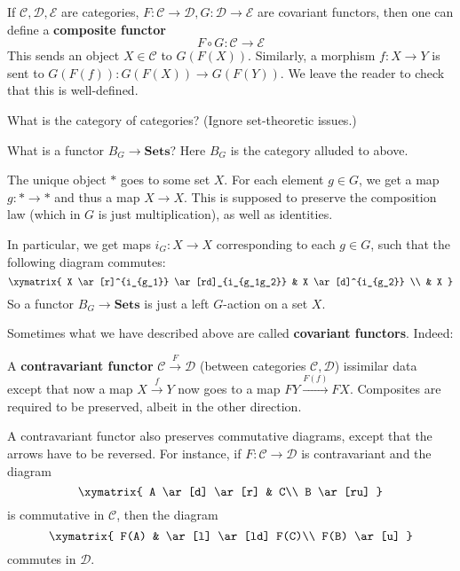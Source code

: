 \begin{definition}
If $\mathcal{C}, \mathcal{D}, \mathcal{E}$ are categories, $F: \mathcal{C} \to
\mathcal{D}, G: \mathcal{D} \to \mathcal{E}$ are covariant functors, then one
can define a \textbf{composite functor}
\[ F \circ G: \mathcal{C}  \to \mathcal{E}  \]
This sends an object $X \in \mathcal{C}$ to $G(F(X))$.
Similarly, a morphism $f :X \to Y$ is sent to $G(F(f)): G(F(X)) \to G(F(Y))$.
We leave the reader to check that this is well-defined.
\end{definition}

\begin{exercise}
What is the category of categories? (Ignore set-theoretic issues.)
\end{exercise}


\begin{example}
What is a functor $B_G \stackrel{}{\to} \mathbf{Sets}$? Here $B_G$ is the
category alluded to above.

The unique object $\ast$ goes to some set $X$. For each element $g \in G$, we
get a map $g: \ast \to \ast$ and thus a map $X \to X$. This is supposed to
preserve the composition law (which in $G$ is just multiplication), as well as
identities.

In particular, we get maps $i_G: X \to X$ corresponding to each $g \in G$, such
that the following diagram commutes:
\[ \xymatrix{
X \ar[r]^{i_{g_1}} \ar[rd]_{i_{g_1g_2}} & X \ar[d]^{i_{g_2}} \\ & X
}\]
So a functor $B_G \to \mathbf{Sets}$ is just a left $G$-action on a set $X$.
\end{example}

Sometimes what we have described above are called \textbf{covariant functors}.
Indeed:

\begin{definition}
A \textbf{contravariant functor}  $\mathcal{C}
\stackrel{F}{\to}\mathcal{D}$ (between categories $\mathcal{C}, \mathcal{D}$)
issimilar
data except that now a map $X \stackrel{f}{\to} Y$ now goes to a map $FY
\stackrel{F(f)}{\to} FX$. Composites
are required to be preserved, albeit in the other direction.
\end{definition}

A contravariant functor also preserves commutative diagrams, except that the
arrows have to be reversed. For instance, if $F: \mathcal{C} \to \mathcal{D}$
is contravariant and the diagram
\[ \xymatrix{
A \ar[d] \ar[r] &  C\\
B \ar[ru]
}\]
is commutative in $\mathcal{C}$, then the diagram
\[ \xymatrix{
F(A)   & \ar[l] \ar[ld] F(C)\\
F(B) \ar[u]
}\]
commutes in $\mathcal{D}$.

